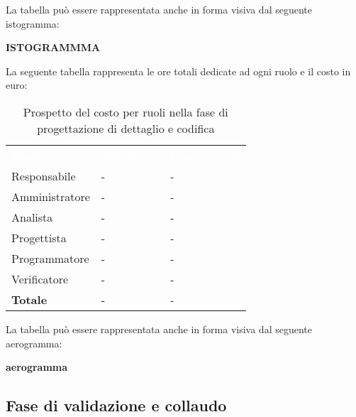 La tabella può essere rappresentata anche in forma visiva dal seguente istogramma:

\textbf{ISTOGRAMMMA}


La seguente tabella rappresenta le ore totali dedicate ad ogni ruolo e il costo in euro:

\begin{table}[!htbp]
\begin{center}
\renewcommand{\arraystretch}{1.5}
\begin{tabular}{ m{}<{\centering}  m{}<{\centering} m{}<{\centering}}
	\rowcolor{darkblue}
	\textcolor{white}{\textbf{Ruolo}}&\textcolor{white}{\textbf{Totale ore}}&\textcolor{white}{\textbf{Costo totale}}\\ 

	Responsabile  & - & - \\	

	\rowcolor{gray!10} Amministratore & - & - \\
	
	Analista & - & - \\
	
	\rowcolor{gray!10} Progettista & - & - \\
	
	Programmatore & - & - \\
	
	\rowcolor{gray!10} Verificatore & - & - \\
	
	\textbf{Totale} & - & - \\
	
\end{tabular}
\caption{Prospetto del costo per ruoli nella fase di progettazione di dettaglio e codifica}
\end{center}
\end{table}

La tabella può essere rappresentata anche in forma visiva dal seguente aerogramma:

\textbf{aerogramma}

\subsection{Fase di validazione e collaudo}
